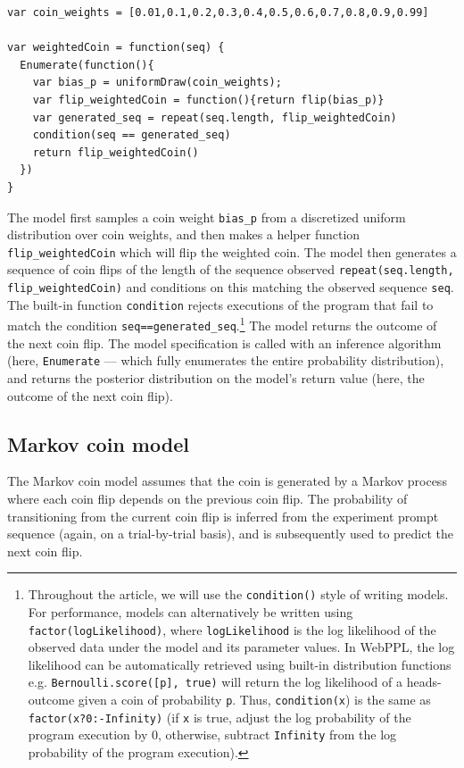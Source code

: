 \documentclass{article}
\begin{document}
\label{lst:m_weighted}
\begin{lstlisting}[caption=Biased coin model]
var coin_weights = [0.01,0.1,0.2,0.3,0.4,0.5,0.6,0.7,0.8,0.9,0.99]

var weightedCoin = function(seq) {
  Enumerate(function(){
    var bias_p = uniformDraw(coin_weights);
    var flip_weightedCoin = function(){return flip(bias_p)}
    var generated_seq = repeat(seq.length, flip_weightedCoin)
    condition(seq == generated_seq)
    return flip_weightedCoin()
  })
}
\end{lstlisting}
%
The model first samples a coin weight \lstinline{bias_p} from a discretized uniform distribution over coin weights, and
then makes a helper function \lstinline{flip_weightedCoin} which will flip the weighted coin.
The model then generates a sequence of coin flips of the length of the sequence observed \lstinline{repeat(seq.length, flip_weightedCoin)} and conditions on this matching the observed sequence \lstinline{seq}.
The built-in function \lstinline{condition} rejects executions of the program that fail to match the condition \lstinline{seq==generated_seq}.\footnote{
Throughout the article, we will use the \lstinline{condition()} style of writing models. For performance, models can alternatively be written using \lstinline{factor(logLikelihood)}, where \lstinline{logLikelihood} is the log likelihood of the observed data under the model and its parameter values. In WebPPL, the log likelihood can be automatically retrieved using built-in distribution functions e.g. \lstinline{Bernoulli.score([p], true)} will return the log likelihood of a heads-outcome given a coin of probability \lstinline{p}.
Thus, \lstinline{condition(x}) is the same as \lstinline{factor(x?0:-Infinity)} (if \lstinline{x} is true, adjust the log probability of the program execution by 0, otherwise, subtract \lstinline{Infinity} from the log probability of the program execution).
}
The model returns the outcome of the next coin flip.
The model specification is called with an inference algorithm (here, \lstinline{Enumerate} --- which fully enumerates the entire probability distribution), and returns the posterior distribution on the model's return value (here, the outcome of the next coin flip).

\subsection{Markov coin model}
\label{s:tutorial:sss:markov}
The Markov coin model assumes that the coin is generated by a Markov process where each coin flip depends on the previous coin flip. The probability of transitioning from the current coin flip is inferred from the experiment prompt sequence (again, on a trial-by-trial basis), and is subsequently used to predict the next coin flip.
%
\end{document}
